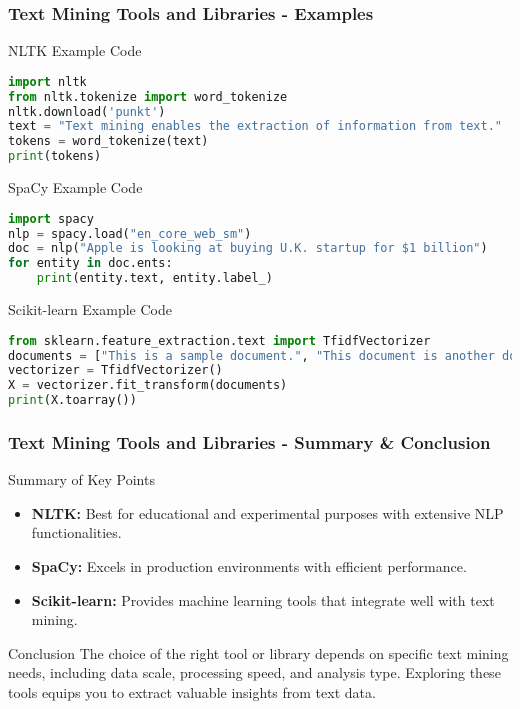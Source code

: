 \documentclass[aspectratio=169]{beamer}
\begin{document}
\begin{frame}[fragile]
  \frametitle{Text Mining Tools and Libraries - Examples}
  \begin{block}{NLTK Example Code}
    \begin{lstlisting}[language=Python]
import nltk
from nltk.tokenize import word_tokenize
nltk.download('punkt')
text = "Text mining enables the extraction of information from text."
tokens = word_tokenize(text)
print(tokens)
    \end{lstlisting}
  \end{block}
  
  \begin{block}{SpaCy Example Code}
    \begin{lstlisting}[language=Python]
import spacy
nlp = spacy.load("en_core_web_sm")
doc = nlp("Apple is looking at buying U.K. startup for $1 billion")
for entity in doc.ents:
    print(entity.text, entity.label_)
    \end{lstlisting}
  \end{block}

  \begin{block}{Scikit-learn Example Code}
    \begin{lstlisting}[language=Python]
from sklearn.feature_extraction.text import TfidfVectorizer
documents = ["This is a sample document.", "This document is another document."]
vectorizer = TfidfVectorizer()
X = vectorizer.fit_transform(documents)
print(X.toarray())
    \end{lstlisting}
  \end{block}
\end{frame}

\begin{frame}[fragile]
  \frametitle{Text Mining Tools and Libraries - Summary & Conclusion}
  \begin{block}{Summary of Key Points}
    \begin{itemize}
      \item \textbf{NLTK:} Best for educational and experimental purposes with extensive NLP functionalities.
      \item \textbf{SpaCy:} Excels in production environments with efficient performance.
      \item \textbf{Scikit-learn:} Provides machine learning tools that integrate well with text mining.
    \end{itemize}
  \end{block}
  
  \begin{block}{Conclusion}
    The choice of the right tool or library depends on specific text mining needs, including data scale, processing speed, and analysis type. Exploring these tools equips you to extract valuable insights from text data.
  \end{block}
\end{frame}
\end{document}
